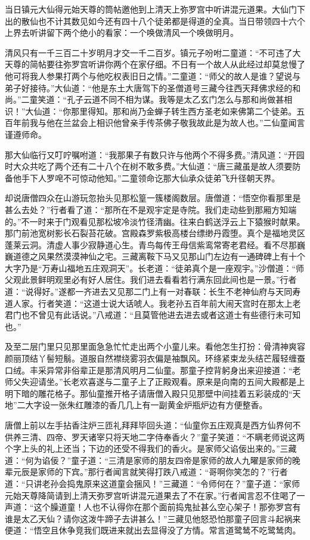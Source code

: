 \documentclass[12pt,UTF8]{ctexbook}
\begin{document}
当日镇元大仙得元始天尊的筒帖邀他到上清天上弥罗宫中听讲混元道果。大仙门下出的散仙也不计其数见如今还有四十八个徒弟都是得道的全真。当日带领四十六个上界去听讲留下两个绝小的看家：一个唤做清风一个唤做明月。

清风只有一千三百二十岁明月才交一千二百岁。镇元子吩咐二童道：“不可违了大天尊的简帖要往弥罗宫听讲你两个在家仔细。不日有一个故人从此经过却莫怠慢了他可将我人参果打两个与他吃权表旧日之情。”二童道：“师父的故人是谁？望说与弟子好接待。”大仙道：“他是东土大唐驾下的圣僧道号三藏今往西天拜佛求经的和尚。”二童笑道：“孔子云道不同不相为谋。我等是太乙玄门怎么与那和尚做甚相识！”大仙道：“你那里得知。那和尚乃金蝉子转生西方圣老如来佛第二个徒弟。五百年前我与他在兰盆会上相识他曾亲手传茶佛子敬我故此是为故人也。”二仙童闻言谨遵师命。

那大仙临行又叮咛嘱咐道：“我那果子有数只许与他两个不得多费。”清风道：“开园时大众共吃了两个还有二十八个在树不敢多费。”大仙道：“唐三藏虽是故人须要防备他手下人罗唣不可惊动他知。”二童领命讫那大仙承众徒弟飞升径朝天界。

却说唐僧四众在山游玩忽抬头见那松篁一簇楼阁数层。唐僧道：“悟空你看那里是甚么去处？”行者看了道：“那所在不是观宇定是寺院。我们走动些到那厢方知端的。”不一时来于门观看见那松坡冷淡竹径清幽。往来白鹤送浮云上下猿猴时献果。那门前池宽树影长石裂苔花破。宫殿森罗紫极高楼台缥缈丹霞堕。真个是福地灵区蓬莱云洞。清虚人事少寂静道心生。青鸟每传王母信紫鸾常寄老君经。看不尽那巍巍道德之风果然漠漠神仙之宅。三藏离鞍下马又见那山门左边有一通碑碑上有十个大字乃是“万寿山福地五庄观洞天”。长老道：“徒弟真个是一座观宇。”沙僧道：“师父观此景鲜明观里必有好人居住。我们进去看看若行满东回此间也是一景。”行者道：“说得好。”遂都一齐进去又见那二门上有一对春联：长生不老神仙府与天同寿道人家。行者笑道：“这道士说大话唬人。我老孙五百年前大闹天宫时在那太上老君门也不曾见有此话说。”八戒道：“且莫管他进去进去或者这道士有些德行未可知也。”

及至二层门里只见那里面急急忙忙走出两个小童儿来。看他怎生打扮：骨清神爽容颜丽顶结丫髻短鬅。道服自然襟绕雾羽衣偏是袖飘风。环绦紧束龙头结芒履轻缠蚕口绒。丰采异常非俗辈正是那清风明月二仙童。那童子控背躬身出来迎接道：“老师父失迎请坐。”长老欢喜遂与二童子上了正殿观看。原来是向南的五间大殿都是上明下暗的雕花格子。那仙童推开格子请唐僧入殿只见那壁中间挂着五彩装成的“天地”二大字设一张朱红雕漆的香几几上有一副黄金炉瓶炉边有方便整香。

唐僧上前以左手拈香注炉三匝礼拜拜毕回头道：“仙童你五庄观真是西方仙界何不供养三清、四帝、罗天诸宰只将天地二字侍奉香火？”童子笑道：“不瞒老师说这两个字上头的礼上还当；下边的还受不得我们的香火。是家师父谄佞出来的。”三藏道：“何为谄佞？”童子道：“三清是家师的朋友四帝是家师的故人九曜是家师的晚辈元辰是家师的下宾。”那行者闻言就笑得打跌八戒道：“哥啊你笑怎的？”行者道：“只讲老孙会捣鬼原来这道童会捆风！”三藏道：“令师何在？”童子道：“家师元始天尊降简请到上清天弥罗宫听讲混元道果去了不在家。”行者闻言忍不住喝了一声道：“这个臊道童！人也不认得你在那个面前捣鬼扯甚么空心架子！那弥罗宫有谁是太乙天仙？请你这泼牛蹄子去讲甚么！”三藏见他怒恐怕那童子回言斗起祸来便道：“悟空且休争竞我们既进来就出去显得没了方情。常言道鹭鸶不吃鹭鸶肉。
\end{document}
